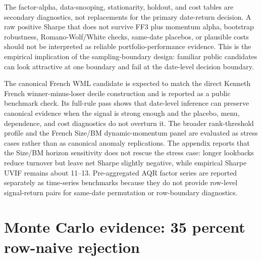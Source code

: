\documentclass[12pt,a4paper]{article}
\begin{document}
The factor-alpha, data-snooping, stationarity, holdout, and cost tables
are secondary diagnostics, not replacements for the primary date-return
decision.  A raw positive Sharpe that does not survive FF3 plus momentum
alpha, bootstrap robustness, Romano-Wolf/White checks, same-date
placebos, or plausible costs should not be interpreted as reliable
portfolio-performance evidence.  This is the empirical implication of
the sampling-boundary design: familiar
public candidates can look attractive at one boundary and fail at the
date-level decision boundary.



The canonical French WML candidate is expected to match the direct
Kenneth French winner-minus-loser decile construction and is reported as
a public benchmark check.  Its full-rule pass shows that date-level
inference can preserve canonical evidence when the signal is strong
enough and the placebo, menu, dependence, and cost diagnostics do not
overturn it.  The broader rank-threshold profile and the French Size/BM
dynamic-momentum panel are evaluated as stress cases rather than as
canonical anomaly replications.  The appendix reports that the Size/BM
horizon sensitivity does not rescue the stress case: longer lookbacks
reduce turnover but leave net Sharpe slightly negative, while empirical
Sharpe UVIF remains about 11--13.  Pre-aggregated AQR factor series are
reported separately as time-series benchmarks because they do not provide
row-level signal-return pairs for same-date permutation or row-boundary
diagnostics.

\section{Monte Carlo evidence: 35 percent row-naive rejection}
\label{sec:simulation}
\end{document}
